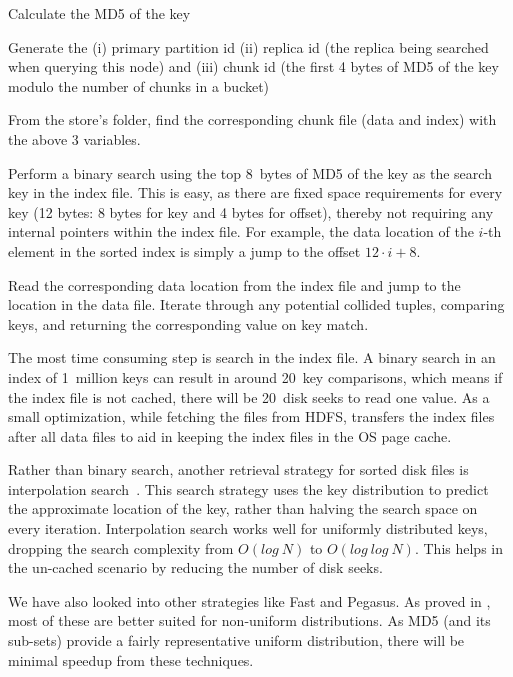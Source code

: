 \begin{compactenum}
  \item Calculate the MD5 of the key
  \item Generate the (i) primary partition id (ii) replica id (the replica being
searched when querying this node) and (iii) chunk id (the first 4 bytes of
MD5 of the key modulo the number of chunks in a bucket)
  \item From the store's folder, find the corresponding chunk file 
(data and index) with the above 3 variables.
  \item Perform a binary search using the top 8~bytes of MD5 of the
key as the search key in the index file. This is easy, as there are
fixed space requirements for every key (12 bytes: 8 bytes for key and
4 bytes for offset), thereby not requiring any internal pointers
within the index file. For example, the data location of the $i$-th
element in the sorted index is simply a jump to
the offset $12 \cdot i + 8$.  
  \item Read the corresponding data location from the index file
and jump to the location in the data file. Iterate through any 
potential collided tuples, comparing keys, and returning the 
corresponding value on key match. 
\end{compactenum}

The most time consuming step is search in the index file. A binary
search in an index of 1~million keys can result in around 20~key
comparisons, which means if the index file is not cached, there will be
20~disk seeks to read one value. As a small optimization, while
fetching the files from HDFS, \projectname{} transfers the index files
after all data files to aid in keeping the index files in the OS page
cache.

Rather than binary search, another retrieval strategy for sorted disk
files is interpolation search~\cite{manolopoulos}. This search
strategy uses the key distribution to predict the approximate location
of the key, rather than halving the search space on every iteration.
Interpolation search works well for uniformly distributed keys,
dropping the search complexity from $O(log~N)$ to $O(log~log~N)$. This
helps in the un-cached scenario by reducing the number of disk seeks.

We have also looked into other strategies like Fast and Pegasus. As
proved in \citet{manolopoulos}, most of these are better suited for
non-uniform distributions. As MD5 (and its sub-sets) provide a fairly
representative uniform distribution, there will be minimal speedup
from these techniques.

